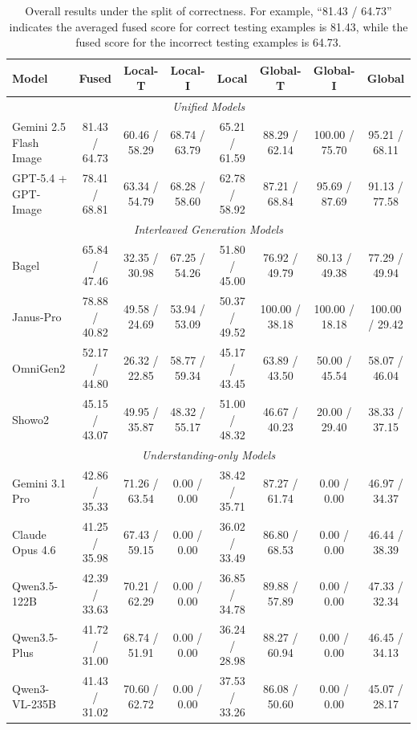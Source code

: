 \documentclass[11pt]{article}
\begin{document}
\begin{table}[t]
  \centering
  \small
  \setlength{\tabcolsep}{2pt}
  \begin{tabular}{l|c|c|c|c|c|c|c}
    \toprule
    Model & Fused & Local-T & Local-I & Local & Global-T & Global-I & Global \\
    \midrule
    \multicolumn{8}{c}{\textit{Unified Models}} \\
    \midrule
    Gemini 2.5 Flash Image  & 81.43 / 64.73 & 60.46 / 58.29 & 68.74 / 63.79 & 65.21 / 61.59 & 88.29 / 62.14 & 100.00 / 75.70 & 95.21 / 68.11 \\
    GPT-5.4 + GPT-Image & 78.41 / 68.81 & 63.34 / 54.79 & 68.28 / 58.60 & 62.78 / 58.92 & 87.21 / 68.84 & 95.69 / 87.69 & 91.13 / 77.58 \\
    \midrule
    \multicolumn{8}{c}{\textit{Interleaved Generation Models}} \\
    \midrule
    Bagel & 65.84 / 47.46 & 32.35 / 30.98 & 67.25 / 54.26 & 51.80 / 45.00 & 76.92 / 49.79 & 80.13 / 49.38 & 77.29 / 49.94 \\
    Janus-Pro & 78.88 / 40.82 & 49.58 / 24.69 & 53.94 / 53.09 & 50.37 / 49.52 & 100.00 / 38.18 & 100.00 / 18.18 & 100.00 / 29.42 \\
    OmniGen2 & 52.17 / 44.80 & 26.32 / 22.85 & 58.77 / 59.34 & 45.17 / 43.45 & 63.89 / 43.50 & 50.00 / 45.54 & 58.07 / 46.04 \\
    Showo2 & 45.15 / 43.07 & 49.95 / 35.87 & 48.32 / 55.17 & 51.00 / 48.32 & 46.67 / 40.23 & 20.00 / 29.40 & 38.33 / 37.15 \\
    \midrule
    \multicolumn{8}{c}{\textit{Understanding-only Models}} \\
    \midrule
    Gemini 3.1 Pro & 42.86 / 35.33 & 71.26 / 63.54 & 0.00 / 0.00 & 38.42 / 35.71 & 87.27 / 61.74 & 0.00 / 0.00 & 46.97 / 34.37 \\
    Claude Opus 4.6 & 41.25 / 35.98 & 67.43 / 59.15 & 0.00 / 0.00 & 36.02 / 33.49 & 86.80 / 68.53 & 0.00 / 0.00 & 46.44 / 38.39 \\
    Qwen3.5-122B & 42.39 / 33.63 & 70.21 / 62.29 & 0.00 / 0.00 & 36.85 / 34.78 & 89.88 / 57.89 & 0.00 / 0.00 & 47.33 / 32.34 \\
    Qwen3.5-Plus & 41.72 / 31.00 & 68.74 / 51.91 & 0.00 / 0.00 & 36.24 / 28.98 & 88.27 / 60.94 & 0.00 / 0.00 & 46.45 / 34.13 \\
    Qwen3-VL-235B & 41.43 / 31.02 & 70.60 / 62.72 & 0.00 / 0.00 & 37.53 / 33.26 & 86.08 / 50.60 & 0.00 / 0.00 & 45.07 / 28.17 \\
    \bottomrule
  \end{tabular}
  \caption{Overall results under the split of correctness. For example, ``81.43 / 64.73'' indicates the averaged fused score for correct testing examples is 81.43, while the fused score for the incorrect testing examples is 64.73.}
  \label{tab:correct_wrong_split}
\end{table}
\end{document}
